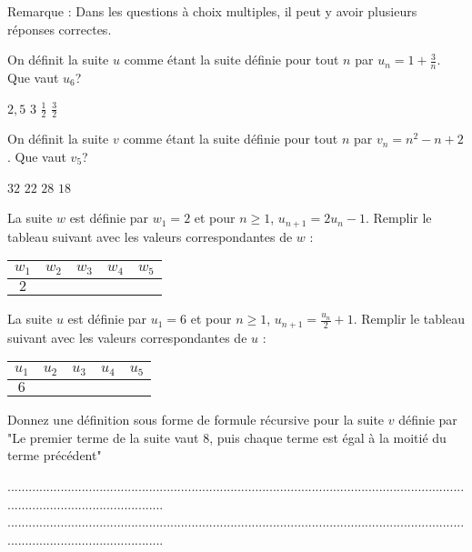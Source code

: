 \documentclass[10pt,a4paper]{exam}
\begin{document}
\vspace{25 mm}


Remarque : Dans les questions à choix multiples, il peut y avoir plusieurs réponses correctes.


On définit la suite $u$ comme étant la suite définie pour tout $n$ par $u_n = 1 + \frac{3}{n}$. Que vaut $u_6$? \newline
\begin{oneparcheckboxes}
   \choice $2,5$
   \choice $3$
   \choice $\frac{1}{2}$
   \choice $\frac{3}{2}$
\end{oneparcheckboxes}

 
On définit la suite $v$ comme étant la suite définie pour tout $n$ par $v_n = n^2 - n +  2$. Que vaut $v_5$? \newline
\begin{oneparcheckboxes}
   \choice $32$
   \choice $22$
   \choice $28$
   \choice $18$
\end{oneparcheckboxes}
 


La suite $w$ est définie par $w_1=2$  et pour $n\geq 1$, $u_{n+1} = 2u_n -1$. Remplir le tableau suivant avec les valeurs correspondantes de $w$ :
\begin{center}
    \begin{tabular}{|c|c|c|c|c|}
       \hline
       $w_1$ & $w_2$ & $w_3$ & $w_4$ & $w_5$ \\
       \hline
       $2$ &   &  & & \\
       \hline
    \end{tabular}
\end{center}




La suite $u$ est définie par $u_1=6$  et pour $n\geq 1$, $u_{n+1} = \frac{u_n}{2} +1$. Remplir le tableau suivant avec les valeurs correspondantes de $u$ :

\begin{center}
\begin{tabular}{|c|c|c|c|c|}
   \hline
   $u_1$ & $u_2$ & $u_3$ & $u_4$ & $u_5$ \\
   \hline
   $6$ &   &  & & \\
   \hline
\end{tabular}
\end{center}



Donnez une définition sous forme de formule récursive pour la suite $v$ définie par  "Le premier terme de la suite vaut 8, puis chaque terme est égal à la moitié du terme précédent"


.............................................................................................................................................................................\newline
.............................................................................................................................................................................
 
\end{document}
